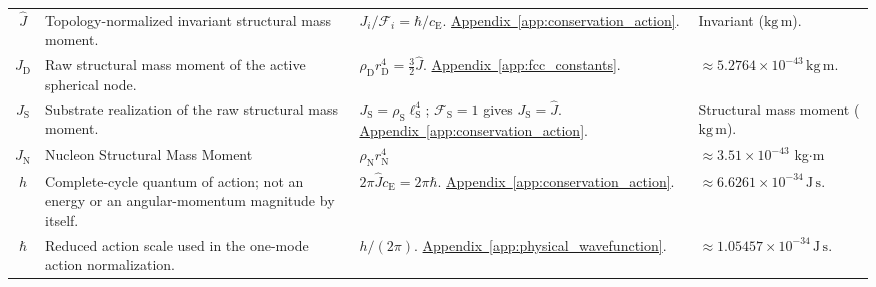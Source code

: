 \begin{longtable}{@{} c p{5.5cm} p{4cm} p{3.5cm} @{}}
$\widehat J$ & {\raggedright Topology-normalized invariant structural mass moment.\par} & {\raggedright $J_i/\mathcal F_i=\hbar/c_{\mathrm E}$. \newline \hyperref[app:conservation_action]{Appendix~\ref*{app:conservation_action}}.\par} & {\raggedright Invariant ($\mathrm{kg\,m}$).\par} \\

$J_{\mathrm D}$ & {\raggedright Raw structural mass moment of the active spherical node.\par} & {\raggedright $\rho_{\mathrm D}r_{\mathrm D}^4=\tfrac32\widehat J$. \newline \hyperref[app:fcc_constants]{Appendix~\ref*{app:fcc_constants}}.\par} & {\raggedright $\approx5.2764\times10^{-43}\,\mathrm{kg\,m}$.\par} \\

$J_{\mathrm S}$ & {\raggedright Substrate realization of the raw structural mass moment.\par} & {\raggedright $J_{\mathrm S}=\rho_{\mathrm S}\ell_{\mathrm S}^4$; $\mathcal F_{\mathrm S}=1$ gives $J_{\mathrm S}=\widehat J$. \newline \hyperref[app:conservation_action]{Appendix~\ref*{app:conservation_action}}.\par} & {\raggedright Structural mass moment ($\mathrm{kg\,m}$).\par} \\


$J_{\mathrm{N}}$ & Nucleon Structural Mass Moment & $\rho_{\mathrm{N}} r_{\mathrm{N}}^4$ & $\approx 3.51 \times 10^{-43}$ kg$\cdot$m \\

$h$ & {\raggedright Complete-cycle quantum of action; not an energy or an angular-momentum magnitude by itself.\par} & {\raggedright $2\pi\widehat J c_{\mathrm E}=2\pi\hbar$. \newline \hyperref[app:conservation_action]{Appendix~\ref*{app:conservation_action}}.\par} & {\raggedright $\approx6.6261\times10^{-34}\,\mathrm{J\,s}$.\par} \\

$\hbar$ & {\raggedright Reduced action scale used in the one-mode action normalization.\par} & {\raggedright $h/(2\pi)$. \newline \hyperref[app:physical_wavefunction]{Appendix~\ref*{app:physical_wavefunction}}.\par} & {\raggedright $\approx1.05457\times10^{-34}\,\mathrm{J\,s}$.\par} \\


\end{longtable}
